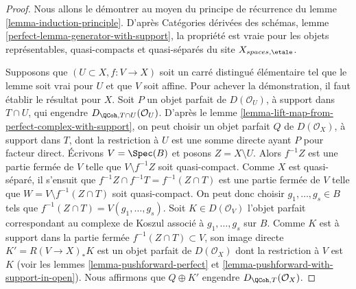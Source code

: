 \begin{proof}
Nous allons le d\'emontrer au moyen du principe de r\'ecurrence du lemme
\ref{lemma-induction-principle}. D'apr\`es Cat\'egories d\'eriv\'ees des
sch\'emas, lemme \ref{perfect-lemma-generator-with-support}, la propri\'et\'e est
vraie pour les objets repr\'esentables, quasi-compacts et quasi-s\'epar\'es du
site $X_{spaces,\etale}$.

\medskip\noindent
Supposons que $(U\subset X,f:V\to X)$ soit un carr\'e distingu\'e
\'el\'ementaire tel que le lemme soit vrai pour $U$ et que $V$ soit affine.
Pour achever la d\'emonstration, il faut \'etablir le r\'esultat pour $X$. Soit
$P$ un objet parfait de $D(\mathcal{O}_U)$, \`a support dans $T\cap U$, qui
engendre $D_{\QCoh,T\cap U}(\mathcal{O}_U)$. D'apr\`es le lemme
\ref{lemma-lift-map-from-perfect-complex-with-support}, on peut choisir un
objet parfait $Q$ de $D(\mathcal{O}_X)$, \`a support dans $T$, dont la
restriction \`a $U$ est une somme directe ayant $P$ pour facteur direct.
\'Ecrivons $V=\Spec(B)$ et posons $Z=X\setminus U$. Alors $f^{-1}Z$ est une
partie ferm\'ee de $V$ telle que $V\setminus f^{-1}Z$ soit quasi-compact.
Comme $X$ est quasi-s\'epar\'e, il s'ensuit que
$f^{-1}Z\cap f^{-1}T=f^{-1}(Z\cap T)$ est une partie ferm\'ee de $V$ telle que
$W=V\setminus f^{-1}(Z\cap T)$ soit quasi-compact. On peut donc choisir
$g_1,\ldots,g_s\in B$ tels que
$f^{-1}(Z\cap T)=V(g_1,\ldots,g_s)$. Soit $K\in D(\mathcal{O}_V)$ l'objet
parfait correspondant au complexe de Koszul associ\'e \`a
$g_1,\ldots,g_s$ sur $B$. Comme $K$ est \`a support dans la partie ferm\'ee
$f^{-1}(Z\cap T)\subset V$, son image directe $K'=R(V\to X)_*K$ est un objet
parfait de $D(\mathcal{O}_X)$ dont la restriction \`a $V$ est $K$ (voir les
lemmes \ref{lemma-pushforward-perfect} et
\ref{lemma-pushforward-with-support-in-open}). Nous affirmons que
$Q\oplus K'$ engendre $D_{\QCoh,T}(\mathcal{O}_X)$.


\end{proof}
